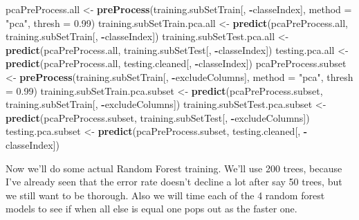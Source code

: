 \documentclass[]{article}
\newenvironment{Shaded}{\begin{snugshade}}{\end{snugshade}}
\newcommand{\CommentTok}[1]{\textcolor[rgb]{0.56,0.35,0.01}{\textit{#1}}}
\newcommand{\DataTypeTok}[1]{\textcolor[rgb]{0.13,0.29,0.53}{#1}}
\newcommand{\DecValTok}[1]{\textcolor[rgb]{0.00,0.00,0.81}{#1}}
\newcommand{\FloatTok}[1]{\textcolor[rgb]{0.00,0.00,0.81}{#1}}
\newcommand{\KeywordTok}[1]{\textcolor[rgb]{0.13,0.29,0.53}{\textbf{#1}}}
\newcommand{\NormalTok}[1]{#1}
\newcommand{\OperatorTok}[1]{\textcolor[rgb]{0.81,0.36,0.00}{\textbf{#1}}}
\newcommand{\OtherTok}[1]{\textcolor[rgb]{0.56,0.35,0.01}{#1}}
\newcommand{\StringTok}[1]{\textcolor[rgb]{0.31,0.60,0.02}{#1}}
\begin{document}
\begin{Shaded}
\begin{Highlighting}[]
\NormalTok{pcaPreProcess.all <-}\StringTok{ }\KeywordTok{preProcess}\NormalTok{(training.subSetTrain[, }\OperatorTok{-}\NormalTok{classeIndex], }\DataTypeTok{method =} \StringTok{"pca"}\NormalTok{, }\DataTypeTok{thresh =} \FloatTok{0.99}\NormalTok{)}
\NormalTok{training.subSetTrain.pca.all <-}\StringTok{ }\KeywordTok{predict}\NormalTok{(pcaPreProcess.all, training.subSetTrain[, }\OperatorTok{-}\NormalTok{classeIndex])}
\NormalTok{training.subSetTest.pca.all <-}\StringTok{ }\KeywordTok{predict}\NormalTok{(pcaPreProcess.all, training.subSetTest[, }\OperatorTok{-}\NormalTok{classeIndex])}
\NormalTok{testing.pca.all <-}\StringTok{ }\KeywordTok{predict}\NormalTok{(pcaPreProcess.all, testing.cleaned[, }\OperatorTok{-}\NormalTok{classeIndex])}
\NormalTok{pcaPreProcess.subset <-}\StringTok{ }\KeywordTok{preProcess}\NormalTok{(training.subSetTrain[, }\OperatorTok{-}\NormalTok{excludeColumns], }\DataTypeTok{method =} \StringTok{"pca"}\NormalTok{, }\DataTypeTok{thresh =} \FloatTok{0.99}\NormalTok{)}
\NormalTok{training.subSetTrain.pca.subset <-}\StringTok{ }\KeywordTok{predict}\NormalTok{(pcaPreProcess.subset, training.subSetTrain[, }\OperatorTok{-}\NormalTok{excludeColumns])}
\NormalTok{training.subSetTest.pca.subset <-}\StringTok{ }\KeywordTok{predict}\NormalTok{(pcaPreProcess.subset, training.subSetTest[, }\OperatorTok{-}\NormalTok{excludeColumns])}
\NormalTok{testing.pca.subset <-}\StringTok{ }\KeywordTok{predict}\NormalTok{(pcaPreProcess.subset, testing.cleaned[, }\OperatorTok{-}\NormalTok{classeIndex])}
\end{Highlighting}
\end{Shaded}

Now we'll do some actual Random Forest training. We'll use 200 trees,
because I've already seen that the error rate doesn't decline a lot
after say 50 trees, but we still want to be thorough. Also we will time
each of the 4 random forest models to see if when all else is equal one
pops out as the faster one.

\begin{Shaded}
\end{Shaded}
\end{document}
